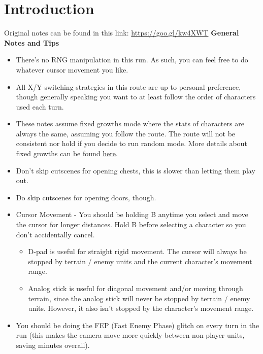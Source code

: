 \section*{Introduction}

Original notes can be found in this link: \url{https://goo.gl/kw4XWT}
\newline\newline
\textbf{\large{General Notes and Tips}}
\newline\newline
\begin{itemize}
    \item There’s no RNG manipulation in this run. As such, you can feel free to do whatever cursor movement you like.
    \item All X/Y switching strategies in this route are up to personal preference, though generally speaking you want to at least follow the order of characters used each turn.
    \item These notes assume fixed growths mode where the stats of characters are always the same, assuming you follow the route. The route will not be consistent nor hold if you decide to run random mode. More details about fixed growths can be found \href{https://serenesforest.net/path-of-radiance/general/fixed-mode/}{here}.
    \item Don’t skip cutscenes for opening chests, this is slower than letting them play out.
    \item Do skip cutscenes for opening doors, though.
    \item Cursor Movement - You should be holding B anytime you select and move the cursor for longer distances. Hold B before selecting a character so you don’t accidentally cancel.
    \begin{itemize}
        \item D-pad is useful for straight rigid movement. The cursor will always be stopped by terrain / enemy units and the current character’s movement range.
        \item Analog stick is useful for diagonal movement and/or moving through terrain, since the analog stick will never be stopped by terrain / enemy units. However, it also isn’t stopped by the character’s movement range.
    \end{itemize}
    \item You should be doing the FEP (Fast Enemy Phase) glitch on every turn in the run (this makes the camera move more quickly between non-player units, saving minutes overall).
    \begin{itemize}

\end{itemize}
\end{itemize}

